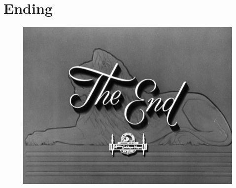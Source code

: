 \documentclass[xetex]{beamer}
\begin{document}
\section*{Ending}
	\begin{frame}[plain]
	    
	      \begin{center}
				\begin{figure}
					\includegraphics[height=\textheight, width=\textwidth]{./picts/bye.jpg}
				\end{figure}
	      \end{center}
	\end{frame}      

\end{document}
